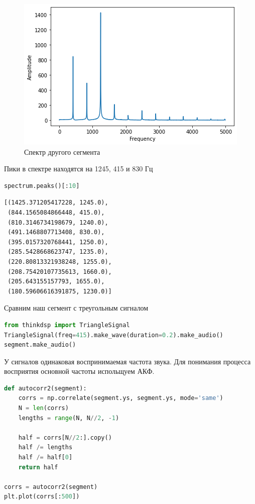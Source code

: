 \begin{figure}[H]
	\begin{center}
		\includegraphics[scale=1]{fig/lab05/lab05_8.png}
		\caption{Спектр другого сегмента}
	\end{center}
\end{figure}

Пики в спектре находятся на 1245, 415 и 830 Гц

\begin{lstlisting}[language=Python]
spectrum.peaks()[:10]
\end{lstlisting}

\begin{lstlisting}
[(1425.371205417228, 1245.0),
 (844.1565084866448, 415.0),
 (810.3146734198679, 1240.0),
 (491.1468807713408, 830.0),
 (395.0157320768441, 1250.0),
 (285.5428668623747, 1235.0),
 (220.80813321938248, 1255.0),
 (208.75420107735613, 1660.0),
 (205.643155157793, 1655.0),
 (180.59606616391875, 1230.0)]
\end{lstlisting}

Сравним наш сегмент с треугольным сигналом

\begin{lstlisting}[language=Python]
from thinkdsp import TriangleSignal
TriangleSignal(freq=415).make_wave(duration=0.2).make_audio()
segment.make_audio()
\end{lstlisting}

У сигналов одинаковая воспринимаемая частота звука. Для понимания процесса восприятия основной частоты испольщуем АКФ.

\begin{lstlisting}[language=Python]
def autocorr2(segment):
    corrs = np.correlate(segment.ys, segment.ys, mode='same')
    N = len(corrs)
    lengths = range(N, N//2, -1)

    half = corrs[N//2:].copy()
    half /= lengths
    half /= half[0]
    return half

corrs = autocorr2(segment)
plt.plot(corrs[:500])
\end{lstlisting}

